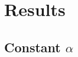 \documentclass[11pt]{beamer}              %
\begin{document}
\section{Results}
\subsection{Constant $\alpha$}
\end{document}

